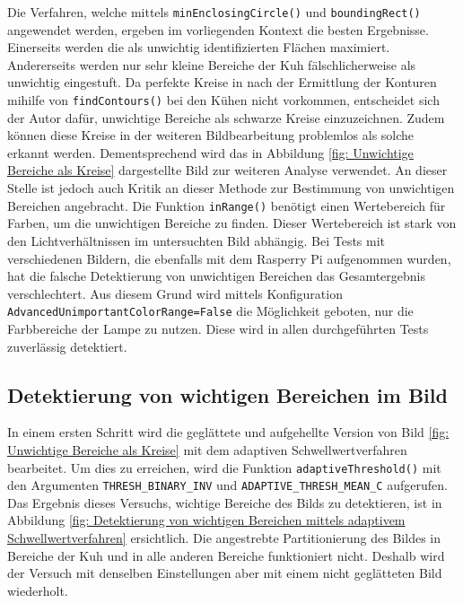 Die Verfahren, welche mittels \texttt{minEnclosingCircle()} und \texttt{boundingRect()} angewendet werden, ergeben im vorliegenden Kontext die besten Ergebnisse. Einerseits werden die als unwichtig identifizierten Flächen  maximiert. Andererseits werden nur sehr kleine Bereiche der Kuh fälschlicherweise als unwichtig eingestuft. Da perfekte Kreise in nach der Ermittlung der Konturen mihilfe von \texttt{findContours()} bei den Kühen nicht vorkommen, entscheidet sich der Autor dafür, unwichtige Bereiche als schwarze Kreise einzuzeichnen. Zudem können diese Kreise in der weiteren Bildbearbeitung problemlos als solche erkannt werden.
Dementsprechend wird das in Abbildung \ref{fig: Unwichtige Bereiche als Kreise} dargestellte Bild zur weiteren Analyse verwendet.
An dieser Stelle ist jedoch auch Kritik an dieser Methode zur Bestimmung von unwichtigen Bereichen angebracht. Die Funktion \texttt{inRange()} benötigt einen Wertebereich für Farben, um die unwichtigen Bereiche zu finden. Dieser Wertebereich ist stark von den Lichtverhältnissen im untersuchten Bild abhängig. Bei Tests mit verschiedenen Bildern, die ebenfalls mit dem Rasperry Pi aufgenommen wurden, hat die falsche Detektierung von unwichtigen Bereichen das Gesamtergebnis verschlechtert. Aus diesem Grund wird mittels Konfiguration \texttt{AdvancedUnimportantColorRange=False} die Möglichkeit geboten, nur die Farbbereiche der Lampe zu nutzen. Diese wird in allen durchgeführten Tests zuverlässig detektiert.  
\subsection{Detektierung von wichtigen Bereichen im Bild}



In einem ersten Schritt wird die geglättete und aufgehellte Version von Bild \ref{fig: Unwichtige Bereiche als Kreise} mit dem adaptiven Schwellwertverfahren bearbeitet. Um dies zu erreichen, wird die Funktion \texttt{adaptiveThreshold()} mit den Argumenten \texttt{THRESH_BINARY_INV} und \texttt{ADAPTIVE_THRESH_MEAN_C} aufgerufen. Das Ergebnis dieses Versuchs, wichtige Bereiche des Bilds zu detektieren, ist in Abbildung \ref{fig: Detektierung von wichtigen Bereichen mittels adaptivem Schwellwertverfahren} ersichtlich. Die angestrebte Partitionierung des Bildes in Bereiche der Kuh und in alle anderen Bereiche funktioniert nicht. Deshalb wird der Versuch mit denselben Einstellungen aber mit einem nicht geglätteten Bild wiederholt.


